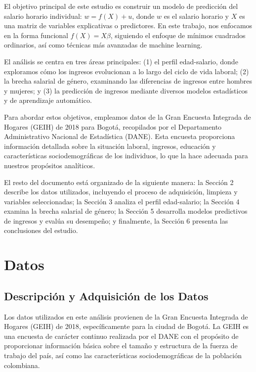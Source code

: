 \documentclass[12pt,a4paper,onecolumn]{article}
\begin{document}
El objetivo principal de este estudio es construir un modelo de predicción del salario horario individual: $w = f(X) + u$, donde $w$ es el salario horario y $X$ es una matriz de variables explicativas o predictores. En este trabajo, nos enfocamos en la forma funcional $f(X) = X\beta$, siguiendo el enfoque de mínimos cuadrados ordinarios, así como técnicas más avanzadas de machine learning.

El análisis se centra en tres áreas principales: (1) el perfil edad-salario, donde exploramos cómo los ingresos evolucionan a lo largo del ciclo de vida laboral; (2) la brecha salarial de género, examinando las diferencias de ingresos entre hombres y mujeres; y (3) la predicción de ingresos mediante diversos modelos estadísticos y de aprendizaje automático.

Para abordar estos objetivos, empleamos datos de la Gran Encuesta Integrada de Hogares (GEIH) de 2018 para Bogotá, recopilados por el Departamento Administrativo Nacional de Estadística (DANE). Esta encuesta proporciona información detallada sobre la situación laboral, ingresos, educación y características sociodemográficas de los individuos, lo que la hace adecuada para nuestros propósitos analíticos.

El resto del documento está organizado de la siguiente manera: la Sección 2 describe los datos utilizados, incluyendo el proceso de adquisición, limpieza y variables seleccionadas; la Sección 3 analiza el perfil edad-salario; la Sección 4 examina la brecha salarial de género; la Sección 5 desarrolla modelos predictivos de ingresos y evalúa su desempeño; y finalmente, la Sección 6 presenta las conclusiones del estudio.

\section{Datos}
\subsection{Descripción y Adquisición de los Datos}

Los datos utilizados en este análisis provienen de la Gran Encuesta Integrada de Hogares (GEIH) de 2018, específicamente para la ciudad de Bogotá. La GEIH es una encuesta de carácter continuo realizada por el DANE con el propósito de proporcionar información básica sobre el tamaño y estructura de la fuerza de trabajo del país, así como las características sociodemográficas de la población colombiana.
\end{document}
